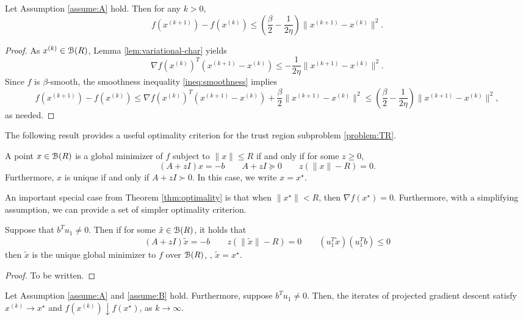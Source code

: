 \documentclass[11pt]{article}
\begin{document}
\begin{lem}
\label{lem:descent-method}
Let Assumption \ref{assume:A} hold. 
Then for any $k > 0$, 
\[
f(x^{(k + 1)}) - 
f(x^{(k)}) \leq 
\left(\frac{\beta}{2} - \frac{1}{2\eta} \right) \|x^{(k + 1)} - x^{(k)}\|^2. 
\]
\end{lem}
\begin{proof}
As $x^{(k)} \in \mathcal{B}(R)$, Lemma \ref{lem:variational-char} yields
\[
\nabla f(x^{(k)})^T(x^{(k + 1)} - x^{(k)}) 
\leq - \frac{1}{2\eta}\|x^{(k + 1)} - x^{(k)}\|^2.
\]
Since $f$ is $\beta$-smooth, the smoothness inequality \eqref{ineq:smoothness} implies 
\[
f(x^{(k + 1)}) - f(x^{(k)}) 
\leq 
\nabla f(x^{(k)})^T(x^{(k + 1)} - x^{(k)}) 
+ \frac{\beta}{2} \|x^{(k + 1)} - x^{(k)}\|^2 
\leq 
\left(\frac{\beta}{2} - \frac{1}{2\eta}\right)  \|x^{(k + 1)} - x^{(k)}\|^2,
\]
as needed.
\end{proof}
The following result provides 
a useful optimality criterion for 
the trust region subproblem 
\eqref{problem:TR}. 
\begin{thm}
\label{thm:optimality}
A point $x \in \mathcal{B}(R)$ is a global minimizer of $f$ subject to $\|x\| \leq R$ if and only if
for some $z \geq 0$, 
\[
(A + zI)x = -b 
\qquad
A  + z I \succeq 0
\qquad 
z(\|x\| - R) = 0.
\]
Furthermore, $x$ is unique if and only if $A + z I \succ 0$. In this case, we write $x = x^\star$. 
\end{thm}
An important special case from Theorem \ref{thm:optimality} is that when $\|x^\star\| < R$, then $\nabla f(x^\star) = 0$.
Furthermore, with a simplifying assumption, we can provide a set of simpler optimality criterion.
\begin{cor}\label{cor:optimality-criterion2} \newcommand{\xopt}{\tilde x}
  Suppose that $b^Tu_1 \neq 0$. Then if for some $\xopt \in \B(R)$, it holds that
  \begin{equation}\label{eqn:pgd-optimality}
  (A + zI)\xopt = -b \qquad z(\|\xopt\| - R) = 0 \qquad (u_1^T \xopt)(u_1^T b) \leq 0 
  \end{equation}
  then $\xopt$ is the unique global minimizer to $f$ over $\mathcal{B}(R)$, \ie, $\xopt = x^\star$. 
\end{cor}
\begin{proof}
  To be written.
\end{proof}
\begin{prop}
Let Assumption \ref{assume:A} and 
\ref{assume:B} 
hold. Furthermore, suppose $b^Tu_1 \neq 0$.
Then, the iterates of projected gradient descent satisfy $x^{(k)} \to x^\star$
and $f(x^{(k)}) \downarrow f(x^\star)$, as $k \to \infty$.
\end{prop}
\end{document}

